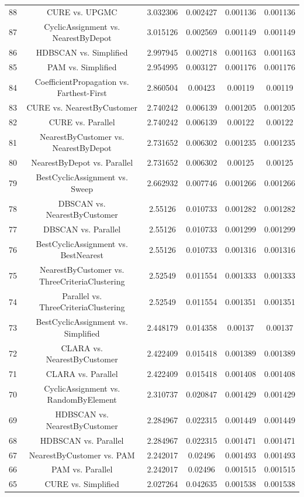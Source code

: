 \documentclass[a4paper,10pt]{article}
\begin{document}
\begin{landscape}
\begin{table}[!htp]
\begin{tabular}{cccccc}
88&CURE vs. UPGMC&3.032306&0.002427&0.001136&0.001136\\
87&CyclicAssignment vs. NearestByDepot&3.015126&0.002569&0.001149&0.001149\\
86&HDBSCAN vs. Simplified&2.997945&0.002718&0.001163&0.001163\\
85&PAM vs. Simplified&2.954995&0.003127&0.001176&0.001176\\
84&CoefficientPropagation vs. Farthest-First&2.860504&0.00423&0.00119&0.00119\\
83&CURE vs. NearestByCustomer&2.740242&0.006139&0.001205&0.001205\\
82&CURE vs. Parallel&2.740242&0.006139&0.00122&0.00122\\
81&NearestByCustomer vs. NearestByDepot&2.731652&0.006302&0.001235&0.001235\\
80&NearestByDepot vs. Parallel&2.731652&0.006302&0.00125&0.00125\\
79&BestCyclicAssignment vs. Sweep&2.662932&0.007746&0.001266&0.001266\\
78&DBSCAN vs. NearestByCustomer&2.55126&0.010733&0.001282&0.001282\\
77&DBSCAN vs. Parallel&2.55126&0.010733&0.001299&0.001299\\
76&BestCyclicAssignment vs. BestNearest&2.55126&0.010733&0.001316&0.001316\\
75&NearestByCustomer vs. ThreeCriteriaClustering&2.52549&0.011554&0.001333&0.001333\\
74&Parallel vs. ThreeCriteriaClustering&2.52549&0.011554&0.001351&0.001351\\
73&BestCyclicAssignment vs. Simplified&2.448179&0.014358&0.00137&0.00137\\
72&CLARA vs. NearestByCustomer&2.422409&0.015418&0.001389&0.001389\\
71&CLARA vs. Parallel&2.422409&0.015418&0.001408&0.001408\\
70&CyclicAssignment vs. RandomByElement&2.310737&0.020847&0.001429&0.001429\\
69&HDBSCAN vs. NearestByCustomer&2.284967&0.022315&0.001449&0.001449\\
68&HDBSCAN vs. Parallel&2.284967&0.022315&0.001471&0.001471\\
67&NearestByCustomer vs. PAM&2.242017&0.02496&0.001493&0.001493\\
66&PAM vs. Parallel&2.242017&0.02496&0.001515&0.001515\\
65&CURE vs. Simplified&2.027264&0.042635&0.001538&0.001538\\

\end{tabular}
\end{table}
\end{landscape}
\end{document}
